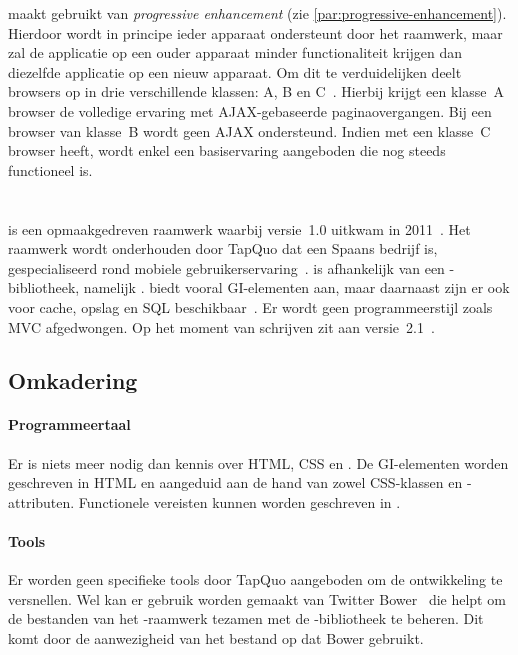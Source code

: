 \jqm{} maakt gebruikt van \emph{progressive enhancement} (zie \ref{par:progressive-enhancement}).
Hierdoor wordt in principe ieder apparaat ondersteunt door het raamwerk, maar zal de applicatie op een ouder apparaat minder functionaliteit krijgen dan diezelfde applicatie op een nieuw apparaat.
Om dit te verduidelijken deelt \jqm{} browsers op in drie verschillende klassen: A, B en C~\cite{JQuery2012d}. 
Hierbij krijgt een klasse~A browser de volledige ervaring met AJAX-gebaseerde paginaovergangen.
Bij een browser van klasse~B wordt geen AJAX ondersteund.
Indien met een klasse~C browser heeft, wordt enkel een basiservaring aangeboden die nog steeds functioneel is.


\section{\lungo}
\label{sec:raamwerk-lungo}
\lungo{} is een opmaakgedreven raamwerk waarbij versie~1.0 uitkwam in 2011~\cite{TapQuo2011}.
Het raamwerk wordt onderhouden door TapQuo dat een Spaans bedrijf is, gespecialiseerd rond mobiele gebruikerservaring~\cite{TapQuo2013a}.
\lungo{} is afhankelijk van een \js{}-bibliotheek, namelijk \quo{}.
\lungo{} biedt vooral GI-elementen aan, maar daarnaast zijn er ook  voor cache, opslag en SQL beschikbaar~\cite{TapQuo2013}.
Er wordt geen programmeerstijl zoals MVC afgedwongen.
Op het moment van schrijven zit \lungo{} aan versie~2.1~\cite{TapQuo2013}.

\subsection{Omkadering}
\paragraph{Programmeertaal}
Er is niets meer nodig dan kennis over HTML, CSS en \js{}.
De GI-elementen worden geschreven in HTML en aangeduid aan de hand van zowel CSS-klassen en -attributen.
Functionele vereisten kunnen worden geschreven in \js{}.

\paragraph{Tools}
Er worden geen specifieke tools door TapQuo aangeboden om de ontwikkeling te versnellen.
Wel kan er gebruik worden gemaakt van Twitter Bower~\cite{Twitter2013} die helpt om de bestanden van het \lungo{}-raamwerk tezamen met de \quo{}-bibliotheek te beheren.
Dit komt door de aanwezigheid van het bestand  op \gh{} dat Bower gebruikt.

